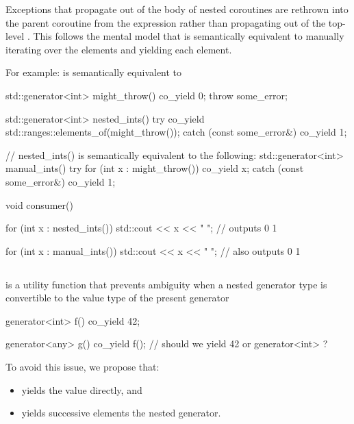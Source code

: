 \documentclass{wg21}
\begin{document}
Exceptions that propagate out of the body of nested  coroutines
are rethrown into the parent coroutine from the  expression rather
than propagating out of the top-level .
This follows the mental model that
 is semantically equivalent to
manually iterating over the elements and yielding each element.

For example:  is semantically equivalent to 
\begin{colorblock}
    std::generator<int> might_throw() {
        co_yield 0;
        throw some_error{};
    }

    std::generator<int> nested_ints() {
        try {
            co_yield std::ranges::elements_of(might_throw());
        } catch (const some_error&) {}
        co_yield 1;
    }

    // nested_ints() is semantically equivalent to the following:
    std::generator<int> manual_ints() {
        try {
            for (int x : might_throw()) {
                co_yield x;
            }
        } catch (const some_error&) {}
        co_yield 1;
    }

    void consumer() {
        for (int x : nested_ints()) {
            std::cout << x << " "; // outputs 0 1
        }

        for (int x : manual_ints()) {
            std::cout << x << " "; // also outputs 0 1
        }
    }
\end{colorblock}

\subsection{}

 is a utility function that prevents ambiguity when a nested generator type is convertible to the value type
of the present generator

\begin{colorblock}
    generator<int> f()
    {
        co_yield 42;
    }

    generator<any> g()
    {
        co_yield f(); // should we yield 42 or generator<int> ?
    }

\end{colorblock}

To avoid this issue, we propose that:
\begin{itemize}
    \item {} yields the value directly, and
    \item {} yields successive elements the nested generator.
\end{itemize}
\end{document}
